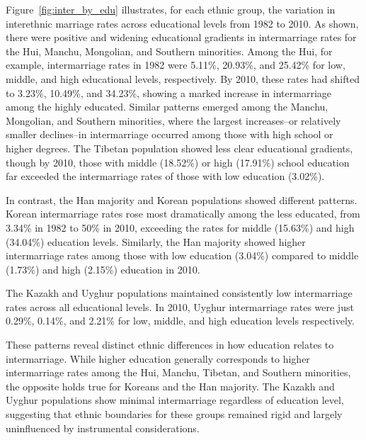 

Figure~\ref{fig:inter_by_edu} illustrates, for each ethnic group, the variation
in interethnic marriage rates across educational levels from 1982 to 2010.
As shown, there were positive and widening educational gradients in
intermarriage rates for the Hui, Manchu, Mongolian, and Southern minorities.
Among the Hui, for example, intermarriage rates in 1982 were 5.11\%, 20.93\%,
and 25.42\% for low, middle, and high educational levels, respectively.
By 2010, these rates had shifted to 3.23\%, 10.49\%, and 34.23\%, showing a
marked increase in intermarriage among the highly educated.
Similar patterns emerged among the Manchu, Mongolian, and Southern minorities,
where the largest increases--or relatively smaller declines--in intermarriage
occurred among those with high school or higher degrees.
The Tibetan population showed less clear educational gradients, though by 2010,
those with middle (18.52\%) or high (17.91\%) school education far exceeded the
intermarriage rates of those with low education (3.02\%).

In contrast, the Han majority and Korean populations showed different patterns.
Korean intermarriage rates rose most dramatically among the less educated, from
3.34\% in 1982 to 50\% in 2010, exceeding the rates for middle (15.63\%) and
high (34.04\%) education levels.
Similarly, the Han majority showed higher intermarriage rates among those with
low education (3.04\%) compared to middle (1.73\%) and high (2.15\%) education
in 2010.

The Kazakh and Uyghur populations maintained consistently low intermarriage
rates across all educational levels.
In 2010, Uyghur intermarriage rates were just 0.29\%, 0.14\%, and 2.21\% for
low, middle, and high education levels respectively.

These patterns reveal distinct ethnic differences in how education relates to
intermarriage.
While higher education generally corresponds to higher intermarriage rates
among the Hui, Manchu, Tibetan, and Southern minorities, the opposite holds true
for Koreans and the Han majority.
The Kazakh and Uyghur populations show minimal intermarriage regardless of
education level, suggesting that ethnic boundaries for these groups remained
rigid and largely uninfluenced by instrumental considerations.